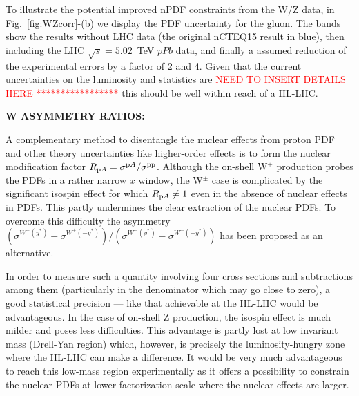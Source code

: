 \documentclass[../report.tex]{subfiles}
\begin{document}
To illustrate the potential improved nPDF constraints from the W/Z data, 
in Fig.~\ref{fig:WZcorr}-(b) we display the PDF uncertainty for the gluon.
The bands show the results without LHC data (the original nCTEQ15 result in blue), 
then including the  LHC $\sqrt{s}=5.02$~TeV $pPb$ data, 
and finally a assumed reduction of the experimental errors by a factor of 2 and 4.
Given that the current uncertainties on the luminosity and statistics are 
\textcolor{red}{NEED TO INSERT DETAILS HERE *****************}
this should be well within reach of a HL-LHC. 




{\bf W ASYMMETRY RATIOS:}

A complementary method  to disentangle the nuclear effects
from proton PDF and other theory uncertainties like higher-order
effects is to form the nuclear modification factor 
$R_{{\rm p}A} = \sigma^{{\rm p}A}/\sigma^{{\rm p}{\rm p}}$.
Although the on-shell W$^\pm$ production probes the PDFs in a rather
narrow $x$ window, the W$^\pm$ case is complicated by the significant
isospin effect for which $R_{{\rm p}A} \neq 1$ even in the absence of
nuclear effects in PDFs. This partly undermines the clear extraction
of the nuclear PDFs. To overcome this difficulty the asymmetry
$(\sigma^{W^+(y^*)}-\sigma^{W^+(-y^*)})/(\sigma^{W^-(y^*)}-\sigma^{W^-(-y^*)})$
has been proposed \cite{Paukkunen:2010qg} as an alternative. 

In order
to measure such a quantity involving four cross sections and
subtractions among them (particularly in the denominator which may go close to zero), a good statistical
precision --- like that achievable at the HL-LHC would be advantageous. 
In the case of on-shell Z production, the isospin effect is much milder \cite{Paukkunen:2010qg}
and poses less difficulties. This advantage is partly lost at low invariant
mass (Drell-Yan region) which, however, is precisely the luminosity-hungry 
zone where the HL-LHC can make a difference. It would be very much advantageous to reach
this low-mass region experimentally as it offers a possibility to constrain the nuclear PDFs at lower factorization 
scale where the nuclear effects are larger. 
\end{document}
